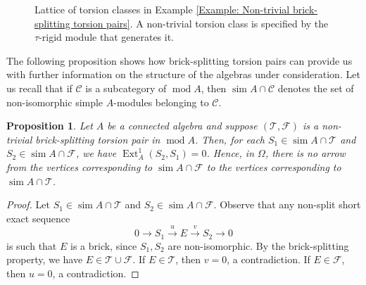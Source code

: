 \documentclass{amsart}
\theoremstyle{thmstyle}
\newtheorem{proposition}[thm]{Proposition}
\theoremstyle{exstyle}
\theoremstyle{defstyle}
\theoremstyle{remstyle}
\theoremstyle{remstyle}
\newcommand{\Ext}{\operatorname{Ext}}
\DeclareMathOperator*{\modu}{mod}
\DeclareMathOperator*{\simp}{sim}
\begin{document}
\begin{figure}\label{Fig. for Example}
\begin{center}
\end{center}
\caption{Lattice of torsion classes in Example \ref{Example: Non-trivial brick-splitting torsion pairs}. A non-trivial torsion class is specified by the $\tau$-rigid module that generates it.}
\end{figure}

The following proposition shows how brick-splitting torsion pairs can provide us with further information on the structure of the algebras under consideration. Let us recall that if $\mathcal{C}$ is a subcategory of $\modu A$, then $\simp A\cap \mathcal{C}$ denotes the set of non-isomorphic simple $A$-modules belonging to $\mathcal{C}$.

\begin{proposition} \label{Prop: extension between simples}
Let $A$ be a connected algebra and suppose $(\mathcal{T},\mathcal{F})$ is a non-trivial brick-splitting torsion pair in $\modu A$. Then, for each $S_1 \in \simp A\cap \mathcal{T}$ and $S_2 \in \simp A \cap \mathcal{F}$, we have $\Ext^1_A(S_2, S_1)=0$. Hence, in $\Omega$, there is no arrow from the vertices corresponding to $\simp A \cap \mathcal{F}$ to the vertices corresponding to $\simp A \cap \mathcal{T}$.
\end{proposition}

\begin{proof}
Let $S_1 \in \simp A\cap \mathcal{T}$ and $S_2 \in \simp A \cap \mathcal{F}$. Observe that any non-split short exact sequence
$$0 \to S_1 \stackrel{u}{\to} E \stackrel{v}{\to} S_2 \to 0$$
is such that $E$ is a brick, since $S_1, S_2$ are non-isomorphic. By the brick-splitting property, we have $E \in \mathcal{T}\cup \mathcal{F}$. If $E \in \mathcal{T}$, then $v=0$, a contradiction. If $E \in \mathcal{F}$, then $u=0$, a contradiction.
\end{proof}
\end{document}
